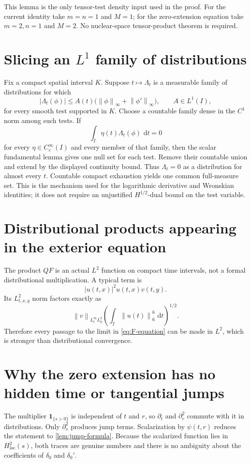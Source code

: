\documentclass[11pt,oneside]{book}
\theoremstyle{definition}
\theoremstyle{remark}
\newcommand{\1}{\mathbf 1}
\newcommand{\loc}{\mathrm{loc}}
\newcommand{\dd}{\,\mathrm d}
\newcommand{\norm}[1]{\left\lVert #1\right\rVert}
\begin{document}
This lemma is the only tensor-test density input used in the proof.  For the
current identity take $m=n=1$ and $M=1$; for the zero-extension equation take
$m=2,n=1$ and $M=2$.  No nuclear-space tensor-product theorem is required.

\section{Slicing an \texorpdfstring{$L^1$}{L1} family of distributions}
Fix a compact spatial interval $K$.  Suppose $t\mapsto\Lambda_t$ is a
measurable family of distributions for which
\[
 |\Lambda_t(\phi)|\le A(t)
   \bigl(\norm\phi_\infty+\norm{\phi'}_\infty\bigr),
 \qquad A\in L^1(I),
\]
for every smooth test supported in $K$.  Choose a countable family dense in
the $C^1$ norm among such tests.  If
\[
 \int_I\eta(t)\Lambda_t(\phi)\,\dd t=0
\]
for every $\eta\in C_c^\infty(I)$ and every member of that family, then the
scalar fundamental lemma gives one null set for each test.  Remove their
countable union and extend by the displayed continuity bound.  Thus
$\Lambda_t=0$ as a distribution for almost every $t$.  Countable compact
exhaustion yields one common full-measure set.  This is the mechanism used
for the logarithmic derivative and Wronskian identities; it does not require
an unjustified $H^{1/2}$-dual bound on the test variable.

\section{Distributional products appearing in the exterior equation}
The product $QF$ is an actual $L^2$ function on compact time intervals, not a
formal distributional multiplication.  A typical term is
\[
 |u(t,x)|^2u(t,x)v(t,y).
\]
Its $L^2_{t,x,y}$ norm factors exactly as
\[
 \norm v_{L^\infty_tL^2_y}
 \left(\int_I\norm{u(t)}_6^6\,\dd t\right)^{1/2}.
\]
Therefore every passage to the limit in \eqref{eq:F-equation} can be made in
$L^2$, which is stronger than distributional convergence.

\section{Why the zero extension has no hidden time or tangential jumps}
The multiplier $\1_{\{s>0\}}$ is independent of $t$ and $r$, so
$\partial_t$ and $\partial_r^2$ commute with it in distributions.  Only
$\partial_s^2$ produces jump terms.  Scalarization by $\psi(t,r)$ reduces the
statement to \cref{lem:jump-formula}.  Because the scalarized function lies
in $H^2_{\loc}(s)$, both traces are genuine numbers and there is no ambiguity
about the coefficients of $\delta_0$ and $\delta_0'$.
\end{document}

